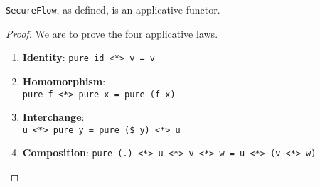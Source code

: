 \begin{proposition}
\texttt{SecureFlow}, as defined, is an applicative functor.
\end{proposition}
\begin{proof}
We are to prove the four applicative laws.
\begin{enumerate}
	\item \textbf{Identity}: \texttt{pure id <*> v = v}
	\item \textbf{Homomorphism}: \\ \texttt{pure f <*> pure x = pure (f x)}
	\item \textbf{Interchange}: \\ \texttt{u <*> pure y = pure (\$ y) <*> u}
	\item \textbf{Composition}: \texttt{pure (.) <*> u <*> v <*> w = u <*> (v <*> w)}
\end{enumerate}
\end{proof}